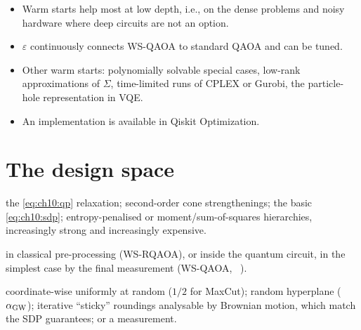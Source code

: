 \documentclass[handoutsbeamer.tex]{subfiles}
\begin{document}
\begin{frame}
\begin{itemize}\setlength\itemsep{0.2em}
    \item Warm starts help most at low depth, i.e., on the dense problems and noisy hardware where deep circuits are not an option.
    \item $\varepsilon$ continuously connects WS-QAOA to standard QAOA and can be tuned.
    \item Other warm starts: polynomially solvable special cases, low-rank approximations of $\Sigma$, time-limited runs of CPLEX or Gurobi, the particle-hole representation in VQE.
    \item An implementation is available in Qiskit Optimization.
\end{itemize}
\end{frame}

\section{The design space}

\begin{frame}
\begin{description}\setlength\itemsep{0.2em}
    \item[What to round?] the \eqref{eq:ch10:qp} relaxation; second-order cone strengthenings; the basic \eqref{eq:ch10:sdp}; entropy-penalised or moment/sum-of-squares hierarchies, increasingly strong and increasingly expensive.
    \item[When to round?] in classical pre-processing (WS-RQAOA), or inside the quantum circuit, in the simplest case by the final measurement (WS-QAOA, \Chap~).
    \item[How to round?] coordinate-wise uniformly at random ($1/2$ for MaxCut); random hyperplane ($\alpha_{\rm GW}$); iterative ``sticky'' roundings analysable by Brownian motion, which match the SDP guarantees; or a measurement.
\end{description}
\end{frame}

\begin{frame}[allowframebreaks]
\biblio
\end{frame}
\end{document}
